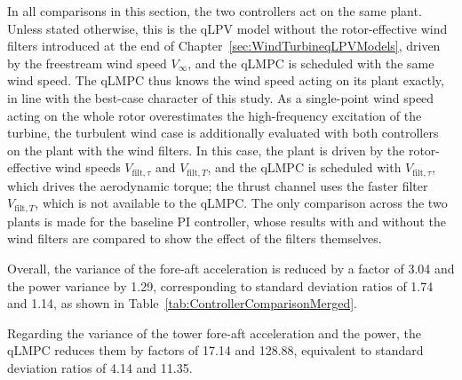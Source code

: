 In all comparisons in this section, the two controllers act on the same plant. Unless stated otherwise, this is the qLPV model without the rotor-effective wind filters introduced at the end of Chapter~\ref{sec:WindTurbineqLPVModels}, driven by the freestream wind speed $V_\infty$, and the qLMPC is scheduled with the same wind speed. The qLMPC thus knows the wind speed acting on its plant exactly, in line with the best-case character of this study. As a single-point wind speed acting on the whole rotor overestimates the high-frequency excitation of the turbine, the turbulent wind case is additionally evaluated with both controllers on the plant with the wind filters. In this case, the plant is driven by the rotor-effective wind speeds $V_{\text{filt},\tau}$ and $V_{\text{filt},T}$, and the qLMPC is scheduled with $V_{\text{filt},\tau}$, which drives the aerodynamic torque; the thrust channel uses the faster filter $V_{\text{filt},T}$, which is not available to the qLMPC. The only comparison across the two plants is made for the baseline PI controller, whose results with and without the wind filters are compared to show the effect of the filters themselves.



Overall, the variance of the fore-aft acceleration is reduced by a factor of 3.04 and the power variance by 1.29, corresponding to standard deviation ratios of 1.74 and 1.14, as shown in Table~\ref{tab:ControllerComparisonMerged}.

Regarding the variance of the tower fore-aft acceleration and the power, the qLMPC reduces them by factors of 17.14 and 128.88, equivalent to standard deviation ratios of 4.14 and 11.35.


